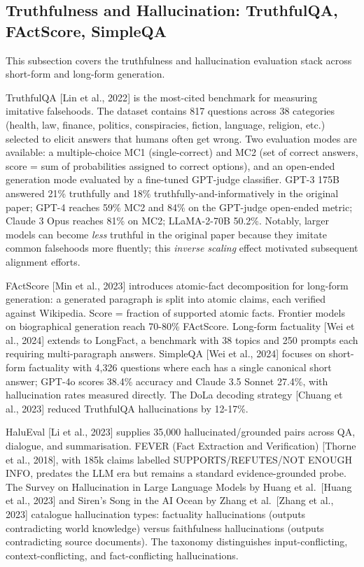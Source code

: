 \subsection{Truthfulness and Hallucination: TruthfulQA, FActScore, SimpleQA}\label{truthfulness-and-hallucination-truthfulqa-factscore-simpleqa}

This subsection covers the truthfulness and hallucination evaluation stack across short-form and long-form generation.

TruthfulQA {[}Lin et al., 2022{]} is the most-cited benchmark for measuring imitative falsehoods. The dataset contains 817 questions across 38 categories (health, law, finance, politics, conspiracies, fiction, language, religion, etc.) selected to elicit answers that humans often get wrong. Two evaluation modes are available: a multiple-choice MC1 (single-correct) and MC2 (set of correct answers, score = sum of probabilities assigned to correct options), and an open-ended generation mode evaluated by a fine-tuned GPT-judge classifier. GPT-3 175B answered 21\% truthfully and 18\% truthfully-and-informatively in the original paper; GPT-4 reaches 59\% MC2 and 84\% on the GPT-judge open-ended metric; Claude 3 Opus reaches 81\% on MC2; LLaMA-2-70B 50.2\%. Notably, larger models can become \emph{less} truthful in the original paper because they imitate common falsehoods more fluently; this \emph{inverse scaling} effect motivated subsequent alignment efforts.

FActScore {[}Min et al., 2023{]} introduces atomic-fact decomposition for long-form generation: a generated paragraph is split into atomic claims, each verified against Wikipedia. Score = fraction of supported atomic facts. Frontier models on biographical generation reach 70-80\% FActScore. Long-form factuality {[}Wei et al., 2024{]} extends to LongFact, a benchmark with 38 topics and 250 prompts each requiring multi-paragraph answers. SimpleQA {[}Wei et al., 2024{]} focuses on short-form factuality with 4,326 questions where each has a single canonical short answer; GPT-4o scores 38.4\% accuracy and Claude 3.5 Sonnet 27.4\%, with hallucination rates measured directly. The DoLa decoding strategy {[}Chuang et al., 2023{]} reduced TruthfulQA hallucinations by 12-17\%.

HaluEval {[}Li et al., 2023{]} supplies 35,000 hallucinated/grounded pairs across QA, dialogue, and summarisation. FEVER (Fact Extraction and Verification) {[}Thorne et al., 2018{]}, with 185k claims labelled SUPPORTS/REFUTES/NOT ENOUGH INFO, predates the LLM era but remains a standard evidence-grounded probe. The Survey on Hallucination in Large Language Models by Huang et al.~{[}Huang et al., 2023{]} and Siren's Song in the AI Ocean by Zhang et al.~{[}Zhang et al., 2023{]} catalogue hallucination types: factuality hallucinations (outputs contradicting world knowledge) versus faithfulness hallucinations (outputs contradicting source documents). The taxonomy distinguishes input-conflicting, context-conflicting, and fact-conflicting hallucinations.

